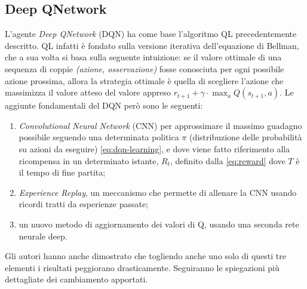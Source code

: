 \documentclass[twoside,twocolumn,10pt]{extarticle}
\theoremstyle{definition}
\begin{document}
	\subsection{Deep Q\texttwelveudash Network}
		L'agente \textit{Deep Q\texttwelveudash Network} (DQN) ha come base l'algoritmo QL precedentemente descritto. QL infatti è fondato sulla versione iterativa dell'equazione di Bellman, che a sua volta si basa sulla seguente intuizione: se il valore ottimale di una sequenza di coppie \textit{(azione, osservazione)} fosse conosciuta per ogni possibile azione prossima, allora la strategia ottimale è quella di scegliere l'azione che massimizza il valore atteso del valore appreso $r_{t + 1} + \gamma \cdot \max_a Q(s_{t + 1}, a)$. Le aggiunte fondamentali del DQN però sono le seguenti:
		\begin{enumerate}
			\item \textit{Convolutional Neural Network} (CNN) per approssimare il massimo guadagno possibile seguendo una determinata politica $\pi$ (distribuzione delle probabilità su azioni da eseguire) \ref{eq:dqn-learning}, e dove viene fatto riferimento alla ricompensa in un determinato istante, $R_t$, definito dalla \ref{eq:reward} dove $T$ è il tempo di fine partita;
			\item \textit{Experience Replay}, un meccanismo che permette di allenare la CNN usando ricordi tratti da esperienze passate;
			\item un nuovo metodo di aggiornamento dei valori di Q, usando una seconda rete neurale deep.
		\end{enumerate}
		Gli autori hanno anche dimostrato che togliendo anche uno solo di questi tre elementi i risultati peggiorano drasticamente. Seguiranno le spiegazioni più dettagliate dei cambiamento apportati.
\end{document}
